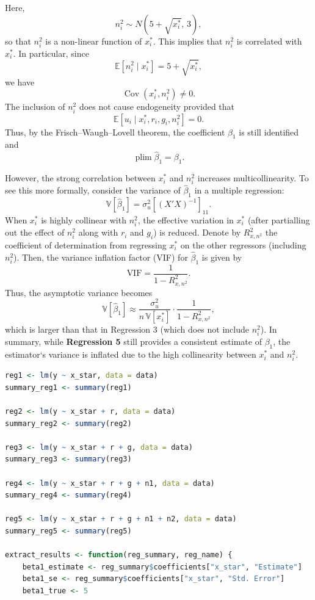 \documentclass[a4paper,12pt]{article} %
\theoremstyle{nonitalic}
\newenvironment{solution}[1]
  {\renewcommand\theinnercustomsol{#1}\innercustomsol}
  {\endinnercustomsol}
\newcounter{solutionctr}
\renewcommand{\thesolutionctr}{(\alph{solutionctr})}
\newenvironment{autosolution}
  {\stepcounter{solutionctr}\begin{solution}{\thesolutionctr}}
  {\end{solution}}
\begin{document}
\begin{autosolution}
Here,
\[
n_i^2 \sim N\left(5+\sqrt{x_i^*},\,3\right),
\]
so that $n_i^2$ is a non-linear function of $x_i^*$. 
This implies that $n_i^2$ is correlated with $x_i^*$. 
In particular, since
\[
\mathbb{E}[n_i^2\mid x_i^*] = 5 + \sqrt{x_i^*},
\]
we have
\[
\operatorname{Cov}(x_i^*, n_i^2) \neq 0.
\]
The inclusion of $n_i^2$ does not cause endogeneity provided that 
\[
\mathbb{E}[u_i \mid x_i^*, r_i, g_i, n_i^2] = 0.
\]
Thus, by the Frisch--Waugh--Lovell theorem, 
the coefficient $\beta_1$ is still identified and
\[
\operatorname*{plim}\hat{\beta}_1 = \beta_1.
\]

However, the strong correlation between $x_i^*$ and $n_i^2$ increases multicollinearity. 
To see this more formally, consider the variance of $\hat{\beta}_1$ in a multiple regression:
\[
\mathbb{V}[\hat{\beta}_1] = \sigma_u^2 \left[(X'X)^{-1}\right]_{11}.
\]
When $x_i^*$ is highly collinear with $n_i^2$, 
the effective variation in $x_i^*$ 
(after partialling out the effect of $n_i^2$ along with $r_i$ and $g_i$) 
is reduced. 
Denote by $R^2_{x,n^2}$ the coefficient of determination from 
regressing $x_i^*$ on the other regressors (including $n_i^2$). 
Then, the variance inflation factor (VIF) for $\hat{\beta}_1$ is given by
\[
\text{VIF} = \frac{1}{1-R^2_{x,n^2}}.
\]
Thus, the asymptotic variance becomes
\[
\mathbb{V}[\hat{\beta}_1] \approx \frac{\sigma_u^2}{n\,\mathbb{V}[x_i^*]}\cdot \frac{1}{1-R^2_{x,n^2}},
\]
which is larger than that in Regression 3 
(which does not include $n_i^2$). 
In summary, while \textbf{Regression 5} still provides a consistent estimate of $\beta_1$, 
the estimator`s variance is inflated due to the high collinearity between $x_i^*$ and $n_i^2$.


\begin{lstlisting}[language=R]
reg1 <- lm(y ~ x_star, data = data)
summary_reg1 <- summary(reg1)

reg2 <- lm(y ~ x_star + r, data = data)
summary_reg2 <- summary(reg2)

reg3 <- lm(y ~ x_star + r + g, data = data)
summary_reg3 <- summary(reg3)

reg4 <- lm(y ~ x_star + r + g + n1, data = data)
summary_reg4 <- summary(reg4)

reg5 <- lm(y ~ x_star + r + g + n1 + n2, data = data)
summary_reg5 <- summary(reg5)

extract_results <- function(reg_summary, reg_name) {
    beta1_estimate <- reg_summary$coefficients["x_star", "Estimate"]
    beta1_se <- reg_summary$coefficients["x_star", "Std. Error"]
    beta1_true <- 5
    

\end{lstlisting}
\end{autosolution}
\end{document}
